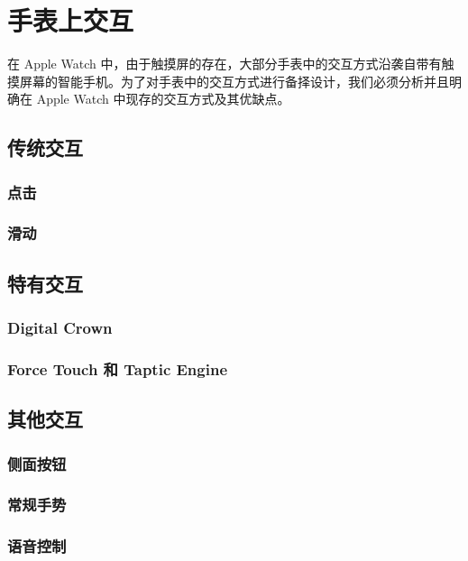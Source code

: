 \chapter{手表上交互}

\quad\quad 在 Apple Watch 中，由于触摸屏的存在，大部分手表中的交互方式沿袭自带有触摸屏幕的智能手机。为了对手表中的交互方式进行备择设计，我们必须分析并且明确在 Apple Watch 中现存的交互方式及其优缺点。

\section{传统交互}

\subsection{点击}

\subsection{滑动}

\section{特有交互}

\subsection{Digital Crown}

\subsection{Force Touch 和 Taptic Engine}

\section{其他交互}

\subsection{侧面按钮}

\subsection{常规手势}

\subsection{语音控制}
